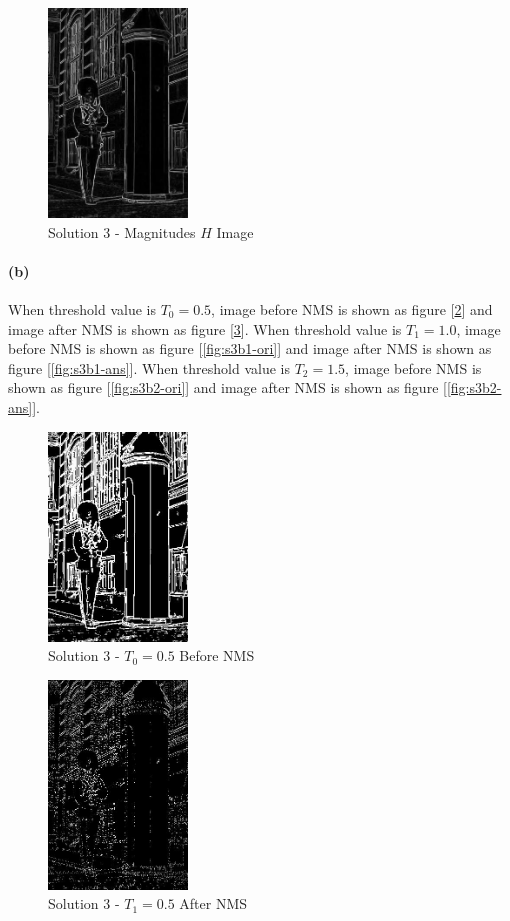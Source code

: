 \documentclass{article}
\newcommand{\spart}[1]{\paragraph{(#1)}}
\begin{document}
\begin{figure}[!h]
  \centering
  \includegraphics[height=15em]{"code/outputs/prob3_a.jpg"}
  \caption{Solution 3 - Magnitudes $H$ Image}
  \label{fig:s3a-ans}
\end{figure}
\spart{b}
When threshold value is $T_0 = 0.5$, image before NMS is shown as figure [\ref{fig:s3b0-ori}] and image after NMS is shown as figure [\ref{fig:s3b0-ans}].
When threshold value is $T_1 = 1.0$, image before NMS is shown as figure [\ref{fig:s3b1-ori}] and image after NMS is shown as figure [\ref{fig:s3b1-ans}].
When threshold value is $T_2 = 1.5$, image before NMS is shown as figure [\ref{fig:s3b2-ori}] and image after NMS is shown as figure [\ref{fig:s3b2-ans}].
\begin{figure}[!h]
  \centering
  \includegraphics[height=15em]{"code/outputs/prob3_b_0.jpg"}
  \caption{Solution 3 - $T_0 = 0.5$ Before NMS}
  \label{fig:s3b0-ori}
\end{figure}
\begin{figure}[!h]
  \centering
  \includegraphics[height=15em]{"code/outputs/prob3_b_nms0.jpg"}
  \caption{Solution 3 - $T_1 = 0.5$ After NMS}
  \label{fig:s3b0-ans}
\end{figure}
\end{document}

